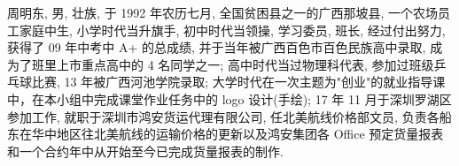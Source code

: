 周明东, 男, 壮族, 于 1992 年农历七月, 全国贫困县之一的广西那坡县, 一个农场员工家庭中生, 小学时代当升旗手, 初中时代当领操, 学习委员, 班长, 经过付出努力, 获得了 09 年中考中 A+ 的总成绩, 并于当年被广西百色市百色民族高中录取, 成为了班里上市重点高中的 4 名同学之一; 高中时代当过物理科代表, 参加过班级乒乓球比赛, 13 年被广西河池学院录取; 大学时代在一次主题为"创业"的就业指导课中，在本小组中完成课堂作业任务中的 logo 设计(手绘); 17 年 11 月于深圳罗湖区参加工作, 就职于深圳市鸿安货运代理有限公司, 任北美航线价格部文员, 负责各船东在华中地区往北美航线的运输价格的更新以及鸿安集团各 Office 预定货量报表和一个合约年中从开始至今已完成货量报表的制作. 

